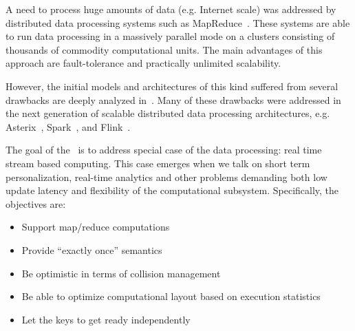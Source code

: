 
\label {fs-intro-seciton}

A need to process huge amounts of data (e.g. Internet scale) was addressed by distributed data processing systems such as MapReduce~\cite{Dean:2008:MSD:1327452.1327492}. These systems are able to run data processing in a massively parallel mode on a clusters consisting of thousands of commodity computational units. The main advantages of this approach are fault-tolerance and practically unlimited scalability.

However, the initial models and architectures of this kind suffered from several drawbacks are deeply analyzed in~\cite{Doulkeridis:2014:SLA:2628707.2628782}. 
Many of these drawbacks were addressed in the next generation of scalable distributed data processing architectures, e.g. 
Asterix~\cite{Alsubaiee:2012:ASW:2331801.2331803}, 
Spark~\cite{Zaharia:2016:ASU:3013530.2934664,Franklin:2015:MSB:2684822.2685326}, 
and Flink~\cite{Carbone:2017:SMA:3137765.3137777}. 

The goal of the \FlameStream ~is to address special case of the data processing: real time stream based computing. This case emerges when we talk on short term personalization, real-time analytics and other problems demanding both low update latency and flexibility of the computational subsystem. Specifically, the objectives are:

\begin {itemize}
\item Support map/reduce computations
\item Provide ``exactly once'' semantics
\item Be optimistic in terms of collision management
\item Be able to optimize computational layout based on execution statistics
\item Let the keys to get ready independently
\end {itemize}

